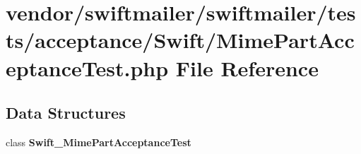 \section{vendor/swiftmailer/swiftmailer/tests/acceptance/\+Swift/\+Mime\+Part\+Acceptance\+Test.php File Reference}
\label{_mime_part_acceptance_test_8php}
\subsection*{Data Structures}
\begin{DoxyCompactItemize}
\item 
class {\bf Swift\+\_\+\+Mime\+Part\+Acceptance\+Test}
\end{DoxyCompactItemize}
